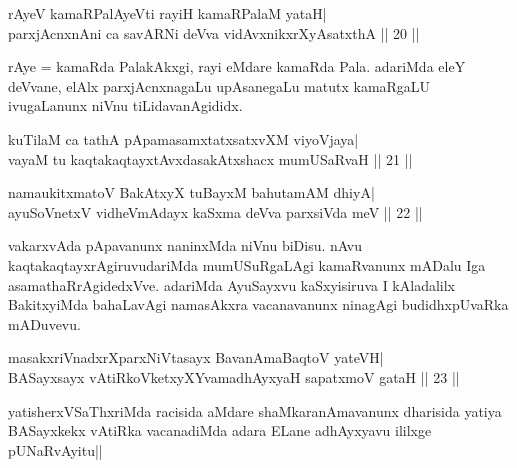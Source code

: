 
\begin{shl}
rAyeV kamaRPalAyeVti rayiH kamaRPalaM yataH| \\
parxjAcnxnAni ca savARNi deVva vidAvxnikxrXyAsatxthA \hfill||  20 ||
\end{shl}

\begin{artha} 
rAye = kamaRda PalakAkxgi, rayi eMdare kamaRda Pala. adariMda eleY 
deVvane, elAlx parxjAcnxnagaLu upAsanegaLu matutx kamaRgaLU 
ivugaLanunx niVnu tiLidavanAgididx.
\end{artha}

\begin{shl}
kuTilaM ca tathA pApamasamxtatxsatxvXM viyoVjaya| \\
vayaM tu kaqtakaqtayxtAvxdasakAtxshacx mumUSaRvaH \hfill||  21 || 
\end{shl}

\begin{shl}
namaukitxmatoV BakAtxyX tuBayxM bahutamAM dhiyA| \\
ayuSoV\s netxV vidheVmAdayx kaSxma deVva parxsiVda meV \hfill||  22 || 
\end{shl}

\begin{artha} 
vakarxvAda pApavanunx naninxMda niVnu biDisu. nAvu 
kaqtakaqtayxrAgiruvudariMda mumUSuRgaLAgi kamaRvanunx mADalu Iga 
asamathaRrAgidedxVve. adariMda AyuSayxvu kaSxyisiruva I kAladalilx 
BakitxyiMda bahaLavAgi namasAkxra vacanavanunx ninagAgi budidhxpUvaRka 
mADuvevu.
\end{artha}

\begin{shl}
masakxriVnadxrXparxNiVtasayx BavanAmaBaqtoV yateVH| \\
BASayxsayx vAtiRkoVketxyXYvamadhAyxyaH sapatxmoV gataH \hfill||  23 || 
\end{shl}

\begin{artha} 
yatisherxVSaThxriMda racisida aMdare shaMkaranAmavanunx 
dharisida yatiya BASayxkekx vAtiRka vacanadiMda adara ELane adhAyxyavu 
ililxge pUNaRvAyitu||
\end{artha}

